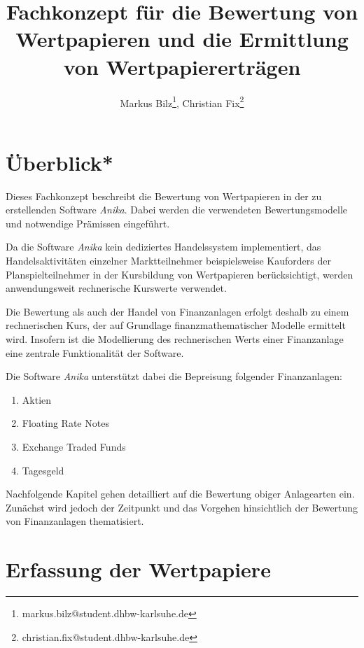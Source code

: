 \documentclass[12pt, a4paper]{article}
\title{Fachkonzept für die Bewertung von Wertpapieren und die Ermittlung von Wertpapiererträgen}
\author{Markus Bilz\thanks{markus.bilz@student.dhbw-karlsuhe.de}, Christian Fix\thanks{christian.fix@student.dhbw-karlsuhe.de}}
\begin{document}
\maketitle

\section{Überblick*}
Dieses Fachkonzept beschreibt die Bewertung von Wertpapieren in der zu erstellenden Software \textit{Anika}. 
Dabei werden die verwendeten Bewertungsmodelle und notwendige Prämissen eingeführt.

Da die Software \textit{Anika} kein dediziertes Handelssystem implementiert, das Handelsaktivitäten einzelner Marktteilnehmer beispielsweise Kauforders der Planspielteilnehmer in der Kursbildung von Wertpapieren berücksichtigt, werden anwendungsweit rechnerische Kurswerte verwendet. 

Die Bewertung als auch der Handel von Finanzanlagen erfolgt deshalb zu einem rechnerischen Kurs, der auf Grundlage finanzmathematischer Modelle ermittelt wird. Insofern ist die Modellierung des rechnerischen Werts einer Finanzanlage eine zentrale Funktionalität der Software.

Die Software \textit{Anika} unterstützt dabei die Bepreisung folgender Finanzanlagen:
\begin{enumerate}
	\item Aktien
	\item Floating Rate Notes
	\item Exchange Traded Funds
	\item Tagesgeld
\end{enumerate}

Nachfolgende Kapitel gehen detailliert auf die Bewertung obiger Anlagearten ein. Zunächst wird jedoch der Zeitpunkt und das Vorgehen hinsichtlich der Bewertung von Finanzanlagen thematisiert.

\section{Erfassung der Wertpapiere}
\label{sec:erfassung_der_wertpapiere}
\end{document}
